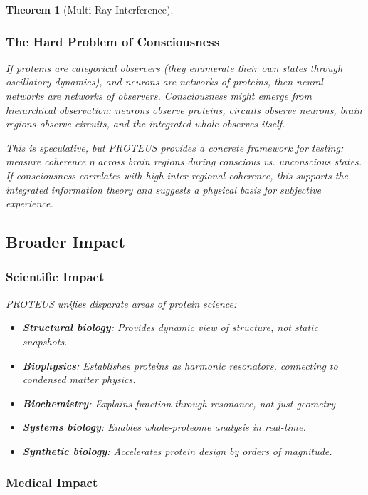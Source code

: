 \documentclass[11pt,a4paper]{article}
\newtheorem{theorem}{Theorem}[section]
\begin{document}
\begin{theorem}[Multi-Ray Interference]
\subsubsection{The Hard Problem of Consciousness}

If proteins are categorical observers (they enumerate their own states through oscillatory dynamics), and neurons are networks of proteins, then neural networks are networks of observers. Consciousness might emerge from hierarchical observation: neurons observe proteins, circuits observe neurons, brain regions observe circuits, and the integrated whole observes itself.

This is speculative, but PROTEUS provides a concrete framework for testing: measure coherence $\eta$ across brain regions during conscious vs. unconscious states. If consciousness correlates with high inter-regional coherence, this supports the integrated information theory \cite{Tononi2016} and suggests a physical basis for subjective experience.

\subsection{Broader Impact}

\subsubsection{Scientific Impact}

PROTEUS unifies disparate areas of protein science:
\begin{itemize}
\item \textbf{Structural biology}: Provides dynamic view of structure, not static snapshots.
\item \textbf{Biophysics}: Establishes proteins as harmonic resonators, connecting to condensed matter physics.
\item \textbf{Biochemistry}: Explains function through resonance, not just geometry.
\item \textbf{Systems biology}: Enables whole-proteome analysis in real-time.
\item \textbf{Synthetic biology}: Accelerates protein design by orders of magnitude.
\end{itemize}

\subsubsection{Medical Impact}


\end{theorem}
\end{document}
